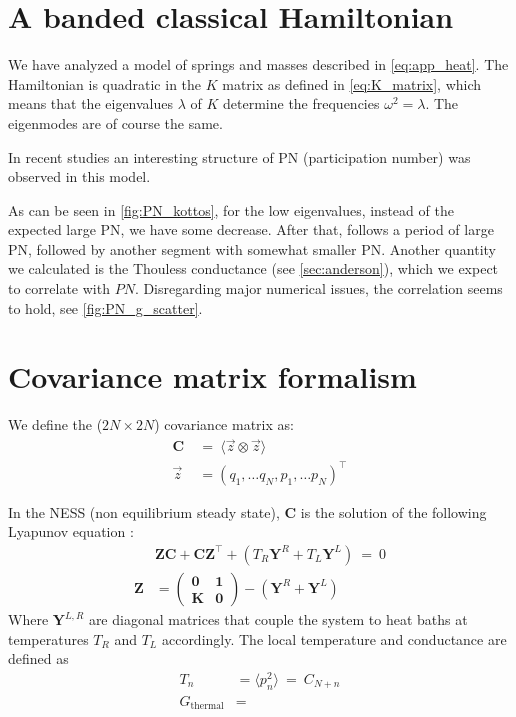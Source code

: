 \section{A banded classical Hamiltonian}%


We have analyzed a model of springs and masses described in \autoref{eq:app_heat}.
The Hamiltonian is quadratic in the $K$ matrix as defined in \autoref{eq:K_matrix},
which means that the eigenvalues $\lambda$ of $K$ determine the frequencies $\omega^2 = \lambda$.
The eigenmodes are of course the same.

In recent studies \cite{bodyfelt_unpub} an interesting structure of
PN (participation number) was observed in this model. 

As can be seen
in \autoref{fig:PN_kottos}, for the low eigenvalues, instead of the 
expected large PN, we have some decrease. After that, follows a period
of large PN, followed by another segment with somewhat smaller PN.
Another quantity we calculated is the Thouless conductance (see \autoref{sec:anderson}), 
which we expect to correlate with $PN$. Disregarding major numerical issues,
the correlation seems to hold, see \autoref{fig:PN_g_scatter}.


\section{Covariance matrix formalism}

We define the ($2N\times 2N$) covariance matrix as:
\begin{align}
\mathbf{C} \ &=\ \langle \vec{z}\otimes \vec{z}\rangle \\
\vec{z} &= (q_1,\ldots q_N, p_1,\ldots p_N)^\intercal
\end{align}


In the NESS (non equilibrium steady state), $\mathbf{C}$ 
is the solution of the following Lyapunov equation \cite{bodyfelt_unpub,zheng,zheng_heat_2011}:
%
\begin{align}
&\mathbf{Z}\mathbf{C} + \mathbf{C}\mathbf{Z}^\intercal + (T_R\mathbf{Y}^R+T_L\mathbf{Y}^L) \ =\  0\\
\mathbf{Z} &= 
              \begin{pmatrix} 
                \mathbf{0} & \mathbf{1} \\
                \mathbf{K} & \mathbf{0} 
              \end{pmatrix} -(\mathbf{Y}^R+\mathbf{Y}^L)
\end{align}
%
Where $\mathbf{Y}^{L,R}$ are diagonal matrices that couple
the system to heat baths at temperatures $T_R$ and $T_L$ accordingly.
%
The local temperature and conductance are defined as
\begin{align}
T_n &= \langle p_n^2 \rangle \ = \ C_{N+n} \\
G_{\textrm{thermal}} &= 
\end{align}


